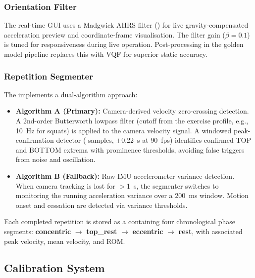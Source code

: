 \subsubsection{Orientation Filter}
The real-time GUI uses a Madgwick AHRS filter () for live gravity-compensated acceleration preview and coordinate-frame visualisation.
The filter gain ($\beta = 0.1$) is tuned for responsiveness during live operation.
Post-processing in the golden model pipeline replaces this with VQF for superior static accuracy.

\subsubsection{Repetition Segmenter}
The  implements a dual-algorithm approach:
\begin{itemize}[nosep]
  \item \textbf{Algorithm A (Primary):} Camera-derived velocity zero-crossing detection. A 2nd-order Butterworth lowpass filter (cutoff from the exercise profile, e.g., \SI{10}{\hertz} for squats) is applied to the camera velocity signal. A windowed peak-confirmation detector ( samples, $\pm$\SI{0.22}{\second} at \SI{90}{fps}) identifies confirmed TOP and BOTTOM extrema with prominence thresholds, avoiding false triggers from noise and oscillation.
  \item \textbf{Algorithm B (Fallback):} Raw IMU accelerometer variance detection. When camera tracking is lost for $>$\SI{1}{\second}, the segmenter switches to monitoring the running acceleration variance over a \SI{200}{\milli\second} window. Motion onset and cessation are detected via variance thresholds.
\end{itemize}

Each completed repetition is stored as a  containing four chronological phase segments: \textbf{concentric} $\rightarrow$ \textbf{top\_rest} $\rightarrow$ \textbf{eccentric} $\rightarrow$ \textbf{rest}, with associated peak velocity, mean velocity, and ROM.


\subsection{Calibration System}

